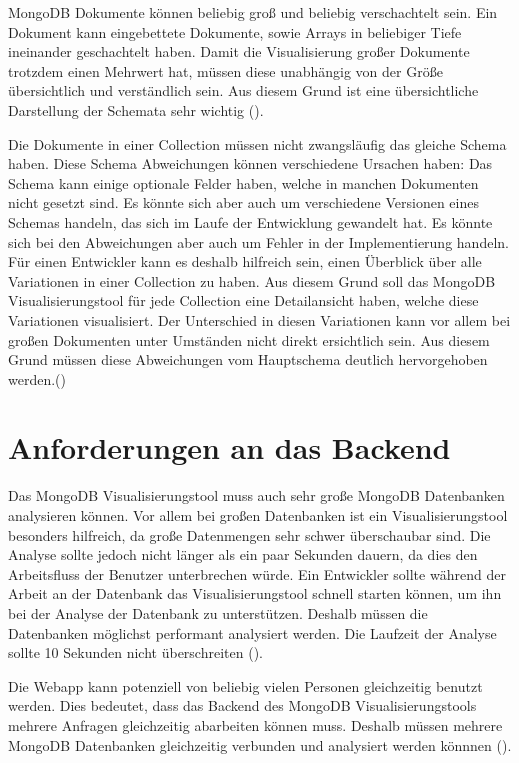 MongoDB Dokumente können beliebig groß und beliebig verschachtelt sein.
Ein Dokument kann eingebettete Dokumente, sowie Arrays in beliebiger Tiefe ineinander geschachtelt haben.
Damit die Visualisierung großer Dokumente trotzdem einen Mehrwert hat, müssen diese unabhängig von der Größe übersichtlich und verständlich sein.
Aus diesem Grund ist eine übersichtliche Darstellung der Schemata sehr wichtig ().

Die Dokumente in einer Collection müssen nicht zwangsläufig das gleiche Schema haben.
Diese Schema Abweichungen können verschiedene Ursachen haben:
Das Schema kann einige optionale Felder haben, welche in manchen Dokumenten nicht gesetzt sind.
Es könnte sich aber auch um verschiedene Versionen eines Schemas handeln, das sich im Laufe der Entwicklung gewandelt hat.
Es könnte sich bei den Abweichungen aber auch um Fehler in der Implementierung handeln.
Für einen Entwickler kann es deshalb hilfreich sein, einen Überblick über alle Variationen in einer Collection zu haben.
Aus diesem Grund soll das MongoDB Visualisierungstool für jede Collection eine Detailansicht haben, welche diese Variationen visualisiert.
Der Unterschied in diesen Variationen kann vor allem bei großen Dokumenten unter Umständen nicht direkt ersichtlich sein.
Aus diesem Grund müssen diese Abweichungen vom Hauptschema deutlich hervorgehoben werden.()

\section{Anforderungen an das Backend}
\label{sec:anf_backend}

Das MongoDB Visualisierungstool muss auch sehr große MongoDB Datenbanken analysieren können.
Vor allem bei großen Datenbanken ist ein Visualisierungstool besonders hilfreich, da große Datenmengen sehr schwer überschaubar sind.
Die Analyse sollte jedoch nicht länger als ein paar Sekunden dauern, da dies den Arbeitsfluss der Benutzer unterbrechen würde.
Ein Entwickler sollte während der Arbeit an der Datenbank das Visualisierungstool schnell starten können, um ihn bei der Analyse der Datenbank zu unterstützen.
Deshalb müssen die Datenbanken möglichst performant analysiert werden.
Die Laufzeit der Analyse sollte 10 Sekunden nicht überschreiten ().

Die Webapp kann potenziell von beliebig vielen Personen gleichzeitig benutzt werden.
Dies bedeutet, dass das Backend des MongoDB Visualisierungstools mehrere Anfragen gleichzeitig abarbeiten können muss.
Deshalb müssen mehrere MongoDB Datenbanken gleichzeitig verbunden und analysiert werden könnnen ().


